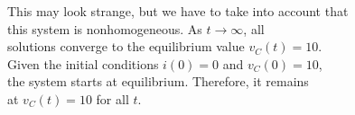 \documentclass[preview]{standalone}
\begin{document}
\begin{center}
\raggedright
                        This may look strange, but we have to take into account that \\ 
                        this system is nonhomogeneous. As $t \rightarrow \infty$, all \\
                        solutions converge to the equilibrium value $v_C(t) = 10$.  \\
                        Given  the initial conditions $i(0) = 0$ and $v_C(0) = 10$, \\
                        the system starts at equilibrium. Therefore, it remains \\
                        at $v_C(t) = 10$ for all $t$.
\end{center}
\end{document}
